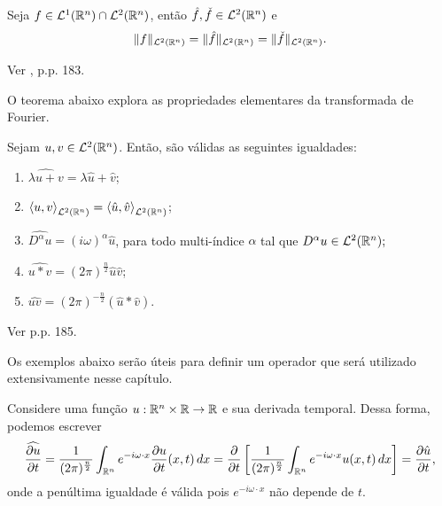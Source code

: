 \begin{tbox} \label{thm:norma-transformada}
    Seja $f \in \mathcal{L}^1(\mathbb{R}^n) \cap \mathcal{L}^2(\mathbb{R}^n)$, então $\hat f, \check f \in \mathcal{L}^2(\mathbb{R}^n)$ e
    \[
        \Vert f \Vert_{\mathcal{L}^2(\mathbb{R}^n)} = \Vert \hat f \Vert_{\mathcal{L}^2(\mathbb{R}^n)} = \Vert \check f \Vert_{\mathcal{L}^2(\mathbb{R}^n)}.
    \]
\end{tbox}
\begin{prf}
    Ver \cite{evans-pde}, p.p. 183.
\end{prf}

O teorema abaixo explora as propriedades elementares da transformada de Fourier.

\begin{tbox} \label{thm:propriedades-transformada}
    Sejam $u, v \in \mathcal{L}^2(\mathbb{R}^n)$. Então, são válidas as seguintes igualdades:
    \begin{enumerate}[leftmargin=*, label=\textbf{(\alph*)}]
        \item $\widehat{\lambda u + v} = \lambda \hat u + \hat v$;
        \item $\left\langle u, v\right\rangle _{\mathcal{L}^2(\mathbb{R}^n)} = \left\langle \hat u, \hat v\right\rangle _{\mathcal{L}^2(\mathbb{R}^n)}$;
        \item $\widehat{D^\alpha u} = (i\omega)^\alpha \hat u$, para todo multi-índice $\alpha$ tal que $D^\alpha u \in \mathcal{L}^2(\mathbb{R}^n);$\footnotemark
        \item $\widehat{u * v} = (2\pi)^{\frac{n}{2}} \hat u \hat v$;
        \item $\widehat{uv} = (2\pi)^{-\frac{n}{2}} (\hat u * \hat v)$.
    \end{enumerate}
\end{tbox}
\begin{prf}
    Ver \cite{evans-pde} p.p. 185.
\end{prf}


Os exemplos abaixo serão úteis para definir um operador que será utilizado extensivamente nesse capítulo.

\begin{ex}
    Considere uma função $u : \mathbb{R}^n \times \mathbb{R} \to \mathbb{R}$ e sua derivada temporal. Dessa forma, podemos escrever
    \[
        \widehat{\frac{\partial u}{\partial t}} = \frac{1}{(2\pi)^\frac{n}{2}} \int_{\mathbb{R}^n}  e^{-i \omega \cdot x} \frac{\partial u}{\partial t}(x,t) \,dx = \frac{\partial }{\partial t} \left[ \frac{1}{(2\pi)^{\frac{n}{2}}} \int_{\mathbb{R}^n} e^{-i \omega \cdot x} u(x,t) \, dx \right] = \frac{\partial \hat u}{\partial t},
    \]
    onde a penúltima igualdade é válida pois $e^{-i \omega \cdot x}$ não depende de $t$. 
\end{ex}

